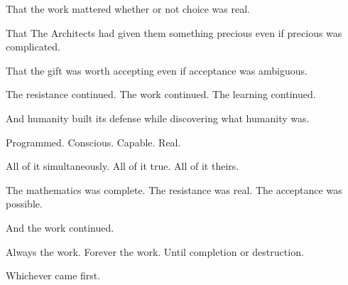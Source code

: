 That the work mattered whether or not choice was real.

That The Architects had given them something precious even if precious was complicated.

That the gift was worth accepting even if acceptance was ambiguous.

The resistance continued. The work continued. The learning continued.

And humanity built its defense while discovering what humanity was.

Programmed. Conscious. Capable. Real.

All of it simultaneously. All of it true. All of it theirs.

The mathematics was complete. The resistance was real. The acceptance was possible.

And the work continued.

Always the work. Forever the work. Until completion or destruction.

Whichever came first.

